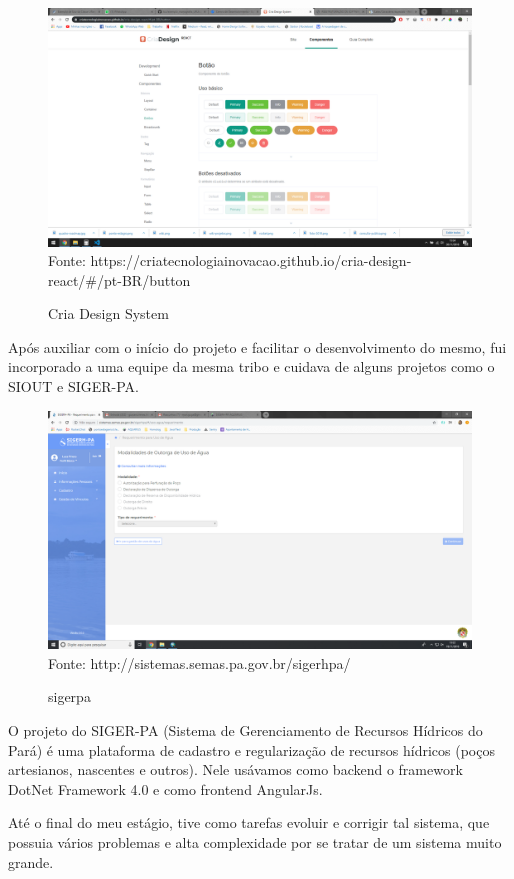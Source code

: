 \begin{figure}[H]
\centering
\caption{Cria Design System} %
\includegraphics[scale=0.3]{cria-design}\\  %
{\small Fonte: https://criatecnologiainovacao.github.io/cria-design-react/#/pt-BR/button} %
\label{fig:exemplo} %
\end{figure}

Após auxiliar com o início do projeto e facilitar o desenvolvimento do mesmo, fui incorporado a uma equipe da mesma tribo e cuidava de alguns projetos como o SIOUT e SIGER-PA.

\begin{figure}[H]
\centering
\caption{sigerpa} %
\includegraphics[scale=0.222]{sigerpa}\\  %
{\small Fonte: http://sistemas.semas.pa.gov.br/sigerhpa/} %
\label{fig:exemplo} %
\end{figure}

O projeto do SIGER-PA (Sistema de Gerenciamento de Recursos Hídricos do Pará) é uma plataforma de cadastro e regularização de recursos hídricos (poços artesianos, nascentes e outros).
Nele usávamos como backend o framework DotNet Framework 4.0 e como frontend AngularJs.

Até o final do meu estágio, tive como tarefas evoluir e corrigir tal sistema, que possuia vários problemas e alta complexidade por se tratar de um sistema muito grande.
